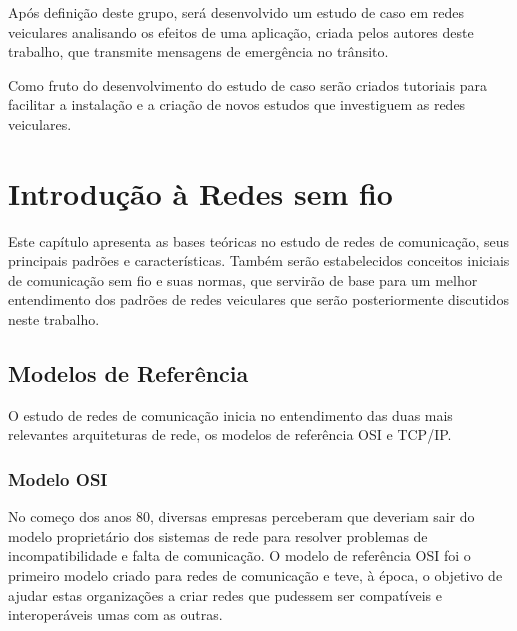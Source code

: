 \documentclass[
12pt,				%
openright,			%
oneside,			%
a4paper,			%
brazil,				%
]{abntex2}
\begin{document}
	\par Após definição deste grupo, será desenvolvido um estudo de caso em redes veiculares analisando os efeitos de uma aplicação, criada pelos autores deste trabalho, que transmite mensagens de emergência no trânsito. 

	\par Como fruto do desenvolvimento do estudo de caso serão criados tutoriais para facilitar a instalação e a criação de novos estudos que investiguem as redes veiculares.
	
	\newpage
	
	\chapter{Introdução à Redes sem fio} %
	
	\par Este capítulo apresenta as bases teóricas no estudo de redes de comunicação, seus principais padrões e características. Também serão estabelecidos conceitos iniciais de comunicação sem fio e suas normas, que servirão de base para um melhor entendimento dos padrões de redes veiculares que serão posteriormente discutidos neste trabalho.
		
	\section{Modelos de Referência}
	
	\par O estudo de redes de comunicação inicia no entendimento das duas mais relevantes arquiteturas de rede, os modelos de referência OSI e TCP/IP. 

	\subsection{Modelo OSI}
	
	\par No começo dos anos 80, diversas empresas perceberam que deveriam sair do modelo proprietário dos sistemas de rede para resolver problemas de incompatibilidade e falta de comunicação. O modelo de referência OSI foi o primeiro modelo criado para redes de comunicação e teve, à época, o objetivo de ajudar estas organizações a criar redes que pudessem ser compatíveis e interoperáveis umas com as outras.
	
\end{document}
